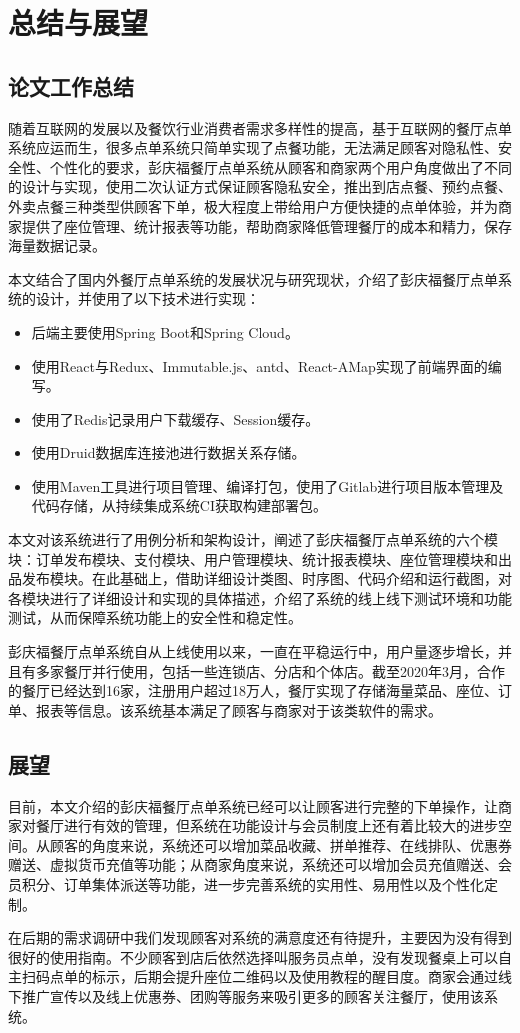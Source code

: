 \chapter{总结与展望}
\section{论文工作总结}
随着互联网的发展以及餐饮行业消费者需求多样性的提高，基于互联网的餐厅点单系统应运而生，很多点单系统只简单实现了点餐功能，无法满足顾客对隐私性、安全性、个性化的要求，彭庆福餐厅点单系统从顾客和商家两个用户角度做出了不同的设计与实现，使用二次认证方式保证顾客隐私安全，推出到店点餐、预约点餐、外卖点餐三种类型供顾客下单，极大程度上带给用户方便快捷的点单体验，并为商家提供了座位管理、统计报表等功能，帮助商家降低管理餐厅的成本和精力，保存海量数据记录。

本文结合了国内外餐厅点单系统的发展状况与研究现状，介绍了彭庆福餐厅点单系统的设计，并使用了以下技术进行实现：
\begin{itemize}
    \item 后端主要使用Spring Boot和Spring Cloud。
    \item 使用React与Redux、Immutable.js、antd、React-AMap实现了前端界面的编写。
    \item 使用了Redis记录用户下载缓存、Session缓存。
    \item 使用Druid数据库连接池进行数据关系存储。
    \item 使用Maven工具进行项目管理、编译打包，使用了Gitlab进行项目版本管理及代码存储，从持续集成系统CI获取构建部署包。
\end{itemize}

本文对该系统进行了用例分析和架构设计，阐述了彭庆福餐厅点单系统的六个模块：订单发布模块、支付模块、用户管理模块、统计报表模块、座位管理模块和出品发布模块。在此基础上，借助详细设计类图、时序图、代码介绍和运行截图，对各模块进行了详细设计和实现的具体描述，介绍了系统的线上线下测试环境和功能测试，从而保障系统功能上的安全性和稳定性。

彭庆福餐厅点单系统自从上线使用以来，一直在平稳运行中，用户量逐步增长，并且有多家餐厅并行使用，包括一些连锁店、分店和个体店。截至2020年3月，合作的餐厅已经达到16家，注册用户超过18万人，餐厅实现了存储海量菜品、座位、订单、报表等信息。该系统基本满足了顾客与商家对于该类软件的需求。

\section{展望}
目前，本文介绍的彭庆福餐厅点单系统已经可以让顾客进行完整的下单操作，让商家对餐厅进行有效的管理，但系统在功能设计与会员制度上还有着比较大的进步空间。从顾客的角度来说，系统还可以增加菜品收藏、拼单推荐、在线排队、优惠券赠送、虚拟货币充值等功能；从商家角度来说，系统还可以增加会员充值赠送、会员积分、订单集体派送等功能，进一步完善系统的实用性、易用性以及个性化定制。

在后期的需求调研中我们发现顾客对系统的满意度还有待提升，主要因为没有得到很好的使用指南。不少顾客到店后依然选择叫服务员点单，没有发现餐桌上可以自主扫码点单的标示，后期会提升座位二维码以及使用教程的醒目度。商家会通过线下推广宣传以及线上优惠券、团购等服务来吸引更多的顾客关注餐厅，使用该系统。